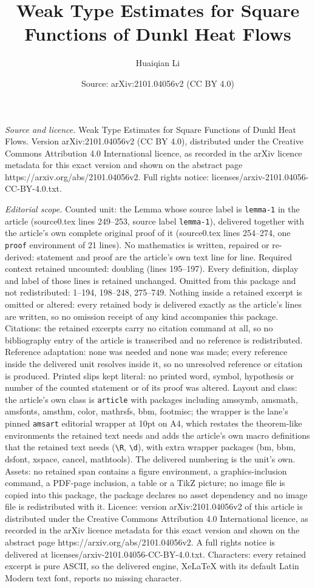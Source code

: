 \documentclass[10pt,a4paper]{amsart}
\title[Weak Type Estimates for Square Functions of Dunkl Heat Flows]{Weak Type Estimates for Square Functions of Dunkl Heat Flows}
\author{Huaiqian Li}
\date{Source: arXiv:2101.04056v2 (CC BY 4.0)}
\begin{document}
\maketitle

\noindent\emph{Source and licence.} Weak Type Estimates for Square Functions of Dunkl Heat Flows. Version arXiv:2101.04056v2 (CC BY 4.0), distributed under the Creative Commons Attribution 4.0 International licence, as recorded in the arXiv licence metadata for this exact version and shown on the abstract page https://arxiv.org/abs/2101.04056v2. Full rights notice: licenses/arxiv-2101.04056-CC-BY-4.0.txt.\par\smallskip

\noindent\textit{Editorial scope.} Counted unit: the Lemma whose source label is \texttt{lemma-1} in the article (source0.tex lines 249--253, source label \texttt{lemma-1}), delivered together with the article's own complete original proof of it (source0.tex lines 254--274, one \texttt{proof} environment of 21 lines). No mathematics is written, repaired or re-derived: statement and proof are the article's own text line for line. Required context retained uncounted: doubling (lines 195--197). Every definition, display and label of those lines is retained unchanged. Omitted from this package and not redistributed: 1--194, 198--248, 275--749. Nothing inside a retained excerpt is omitted or altered: every retained body is delivered exactly as the article's lines are written, so no omission receipt of any kind accompanies this package. Citations: the retained excerpts carry no citation command at all, so no bibliography entry of the article is transcribed and no reference is redistributed. Reference adaptation: none was needed and none was made; every reference inside the delivered unit resolves inside it, so no unresolved reference or citation is produced. Printed slips kept literal: no printed word, symbol, hypothesis or number of the counted statement or of its proof was altered. Layout and class: the article's own class is \texttt{article} with packages including amssymb, amsmath, amsfonts, amsthm, color, mathrsfs, bbm, footmisc; the wrapper is the lane's pinned \texttt{amsart} editorial wrapper at 10pt on A4, which restates the theorem-like environments the retained text needs and adds the article's own macro definitions that the retained text needs (\texttt{\textbackslash R}, \texttt{\textbackslash d}), with extra wrapper packages (bm, bbm, dsfont, xspace, cancel, mathtools). The delivered numbering is the unit's own. Assets: no retained span contains a figure environment, a graphics-inclusion command, a PDF-page inclusion, a table or a TikZ picture; no image file is copied into this package, the package declares no asset dependency and no image file is redistributed with it. Licence: version arXiv:2101.04056v2 of this article is distributed under the Creative Commons Attribution 4.0 International licence, as recorded in the arXiv licence metadata for this exact version and shown on the abstract page https://arxiv.org/abs/2101.04056v2. A full rights notice is delivered at licenses/arxiv-2101.04056-CC-BY-4.0.txt. Characters: every retained excerpt is pure ASCII, so the delivered engine, XeLaTeX with its default Latin Modern text font, reports no missing character.
\end{document}
